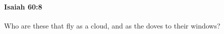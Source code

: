 
		\paragraph{Isaiah 60:8} %
			\label{ISAIAH-60-8}

			Who are these that fly as a cloud, and as the doves to their windows?


